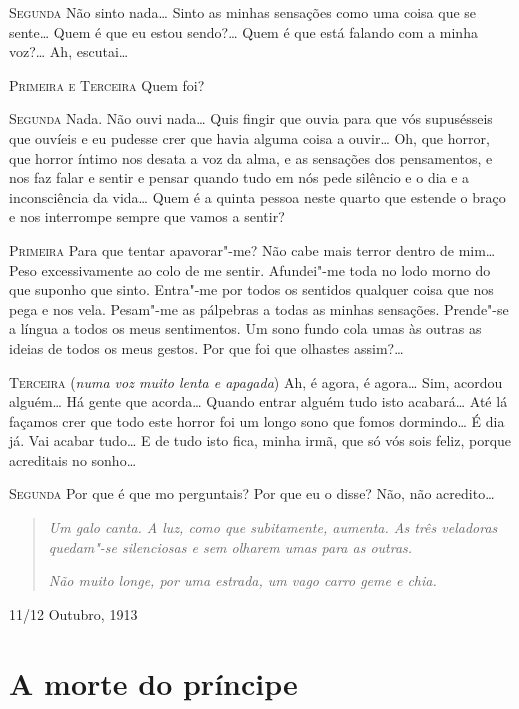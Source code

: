 \textsc{Segunda} Não sinto nada\ldots{} Sinto as
minhas sensações como uma coisa que
se sente\ldots{} Quem é que eu estou sendo?\ldots{} 
Quem é que está falando com a minha voz?\ldots{} 
Ah, escutai\ldots{}

\textsc{Primeira e Terceira} Quem foi?

\textsc{Segunda} Nada. Não ouvi nada\ldots{} 
Quis fingir que ouvia para que vós
supusésseis que ouvíeis e eu pudesse crer 
que havia alguma coisa a ouvir\ldots{} 
Oh, que horror, que horror íntimo nos desata 
a voz da alma, e as sensações dos pensamentos, 
e nos faz falar e sentir e pensar quando
tudo em nós pede silêncio e o dia e a 
inconsciência da vida\ldots{} Quem é a
quinta pessoa neste quarto que estende o braço 
e nos interrompe sempre que vamos a sentir?

\textsc{Primeira} Para que tentar apavorar"-me? 
Não cabe mais terror dentro de
mim\ldots{} 
Peso excessivamente ao colo de
me sentir. 
Afundei"-me toda no
lodo morno do que suponho que sinto. 
Entra"-me por todos os sentidos
qualquer coisa que nos pega e nos vela. 
Pesam"-me as pálpebras a todas as
minhas sensações. Prende"-se a língua a 
todos os meus sentimentos. Um
sono fundo cola umas às outras as ideias de 
todos os meus gestos. Por que foi que olhastes assim?\ldots{}

\textsc{Terceira} (\textit{numa voz muito lenta e apagada})
Ah, é agora, é agora\ldots{} Sim, acordou alguém\ldots{} 
Há gente que acorda\ldots{} Quando entrar
alguém tudo isto acabará\ldots{} Até lá façamos
crer que todo este horror
foi um longo sono que fomos dormindo\ldots{} 
É dia já. Vai acabar tudo\ldots{} E
de tudo isto fica, minha irmã, que só vós sois 
feliz, porque acreditais no sonho\ldots{}

\textsc{Segunda} Por que é que mo perguntais? 
Por que eu o disse? Não, não acredito\ldots{}

\begin{quotation}
\textit{Um galo canta. A luz, como que subitamente, aumenta. 
As três veladoras quedam"-se silenciosas e sem olharem umas 
para as outras.} 

\textit{Não muito longe, por uma estrada, um vago carro geme e chia.} 
\end{quotation}

\hfill 11/12 Outubro, 1913


\chapter{A morte do príncipe}

